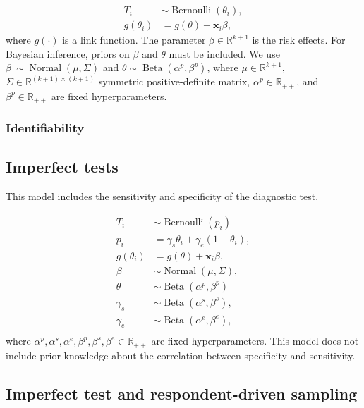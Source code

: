 \documentclass[a4paper, notitlepage, 11pt]{article}
\newcommand{\R}{\mathbb{R}}
\newcommand{\x}{\boldsymbol{x}}
\newcommand{\N}{\operatorname{Normal}}
\newcommand{\betadist}{\operatorname{Beta}}
\theoremstyle{definition}
\theoremstyle{remark}
\begin{document}
\begin{equation}
  \begin{aligned}
    T_i &\sim \operatorname{Bernoulli}(\theta_i), \\
    g(\theta_i) &= g(\theta) + \x_i\beta, 
  \end{aligned}  
\end{equation}
where $g(\cdot)$ is a link function.
The parameter $\beta \in \R^{k+1}$ is the risk effects. For Bayesian inference, priors on
$\beta$ and $\theta$ must be included. We use $\beta ~ \sim \N(\mu, \Sigma)$
and $\theta \sim \betadist(\alpha^{p}, \beta^p)$, where $\mu
\in \R^{k+1}$, $\Sigma \in \R^{(k+1)\times(k+1)}$ symmetric positive-definite matrix,
$\alpha^p \in \R_{++}$, and $\beta^p \in \R_{++}$
are fixed hyperparameters. 

\subsubsection{Identifiability}

\subsection{Imperfect tests}

This model includes the sensitivity and specificity of the diagnostic test. 

\begin{equation}
  \begin{aligned}
    T_i &\sim \operatorname{Bernoulli}(p_i) \\
    p_i &= \gamma_s\theta_i + \gamma_e(1 - \theta_i),  \\
    g(\theta_i) &= g(\theta) + \x_i\beta,  \\
    \beta &\sim \N(\mu, \Sigma), \\ 
    \theta &\sim \betadist(\alpha^p, \beta^p) \\
    \gamma_s &\sim \betadist(\alpha^s, \beta^s), \\
    \gamma_e &\sim \betadist(\alpha^e, \beta^e), \\    
  \end{aligned}  
\end{equation}
where $\alpha^p, \alpha^s, \alpha^e, \beta^p, \beta^s, \beta^e \in \R_{++}$ are fixed hyperparameters.
This model does not include prior knowledge about the correlation between
specificity and sensitivity. 

\subsection{Imperfect test and respondent-driven sampling}
\end{document}
